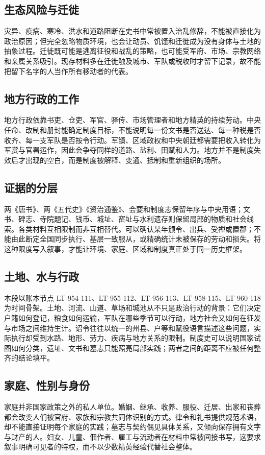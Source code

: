 \subsection{生态风险与迁徙}
灾异、疫病、寒冷、洪水和道路阻断在史书中常被置入治乱修辞，不能被直接化为政治原因；但完全忽略物质环境，也会让动员、饥馑和迁徙成为没有身体与土地的抽象过程。迁徙既可能是逃离征役和战乱的策略，也可能受军府、市场、宗教网络和亲属关系吸引。现存材料多在迁徙触及城市、军队或税收时才留下记录，故不能把留下名字的人当作所有移动者的代表。

\subsection{地方行政的工作}
地方行政依靠书吏、仓吏、军官、驿传、市场管理者和地方精英的持续劳动。中央任命、改制和册封能确定制度目标，不能说明每一份文书是否送达、每一种税是否收齐、每一支军队是否按令行动。军镇、区域政权和中央朝廷都需要把收入转化为军赏与官署运作，因此会争夺同样的道路、盐利、田赋和人力。地方并不是制度失效后才出现的空白，而是制度被解释、变通、抵制和重新组织的场所。

\subsection{证据的分层}
两《唐书》、两《五代史》《资治通鉴》、会要和制度志保留年序与中央用语；文书、碑志、寺院题记、钱币、城址、窑址与水利遗存则保留局部的物质和社会线索。各类材料互相限制而非互相替代。可以确认某年颁令、出兵、受禅或置郡；不能由此断定全国同步执行、基层一致服从，或精确统计未被保存的劳动和损失。将这种限度写入叙事，才能让环境、家庭、区域和制度真正处于同一历史框架。
\subsection{土地、水与行政}
本段以账本节点 LT-954-111、LT-955-112、LT-956-113、LT-958-115、LT-960-118 为时间骨架。土地、河流、山道、草场和城池从不只是政治行动的背景：它们决定户籍如何登记，粮食如何运输，军队在哪些季节可以行动，地方社会又如何在征发与市场之间维持生计。诏令往往以统一的州县、户等和赋役语言描述这些问题，实际执行却受到水路、地形、劳力、疾病与地方关系的限制。制度史可以说明国家试图如何分类，遗址、文书和墓志只能照亮局部实践；两者之间的距离不应被任何整齐的结论填平。

\subsection{家庭、性别与身份}
家庭并非国家政策之外的私人单位。婚姻、继承、收养、服役、迁居、出家和丧葬都会改变人们被官府、家族和宗教共同体识别的方式。律令和礼书提供规范术语，却不能直接证明每个家庭的实践；墓志与契约偶见具体关系，又倾向保存拥有文字与财产的人。妇女、儿童、佃作者、雇工与流动者在材料中常被间接书写，这要求叙事明确可见者的特权，而不以少数精英经验代替社会整体。

